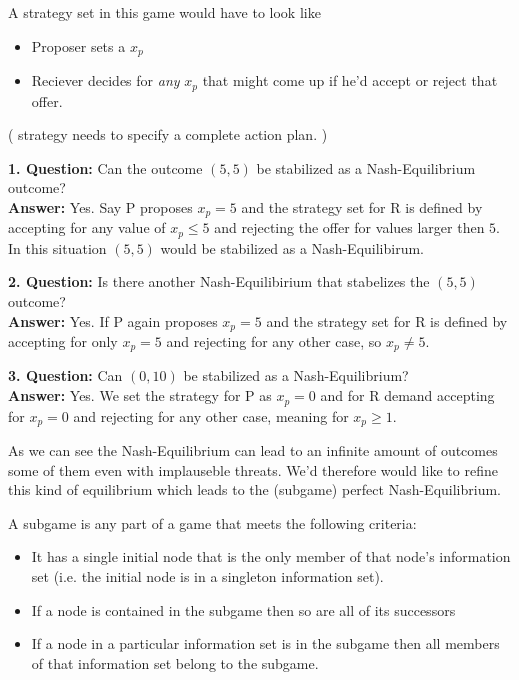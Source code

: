 \begin{example}
	A strategy set in this game would have to look like
	\begin{itemize}
		\item Proposer sets a $x_{p}$
		\item Reciever decides for \textit{any} $x_{p}$ that might come up if he'd accept or reject that offer.
	\end{itemize}
	( strategy needs to specify a complete action plan. )
	
	
	\textbf{1. Question:} Can the outcome $(5, 5)$ be stabilized as a Nash-Equilibrium outcome? \\
	\textbf{Answer:} Yes. Say P proposes $x_{p} = 5$ and the strategy set for R is defined by accepting for any value of $x_{p} \leq 5$ and rejecting the offer for values larger then $5$. \\
		In this situation $(5, 5)$ would be stabilized as a Nash-Equilibirum.


	\textbf{2. Question:} Is there another Nash-Equilibirium that stabelizes the $(5, 5)$ outcome? \\
	\textbf{Answer:} Yes. If P again proposes $x_{p} = 5$ and the strategy set for R is defined by accepting for only $x_{p} = 5$ and rejecting for any other case, so $x_{p} \neq 5$. 
	
	
	\textbf{3. Question:} Can $(0, 10)$ be stabilized as a Nash-Equilibrium? \\
	\textbf{Answer:} Yes. We set the strategy for P as $x_{p} = 0$ and for R demand accepting for $x_{p} = 0$ and rejecting for any other case, meaning for $x_{p} \geq 1$. 
\end{example}

As we can see the Nash-Equilibrium can lead to an infinite amount of outcomes some of them even with implauseble threats. We'd therefore would like to refine this kind of equilibrium which leads to the (subgame) perfect Nash-Equilibrium.

\begin{definition}[Subgame] 
	A subgame is any part of a game that meets the following criteria:
	\begin{itemize}
		\item It has a single initial node that is the only member of that node's information set (i.e. the initial node is in a singleton information set).
		\item If a node is contained in the subgame then so are all of its successors
		\item If a node in a particular information set is in the subgame then all members of that information set belong to the subgame.
	\end{itemize}
\end{definition}

